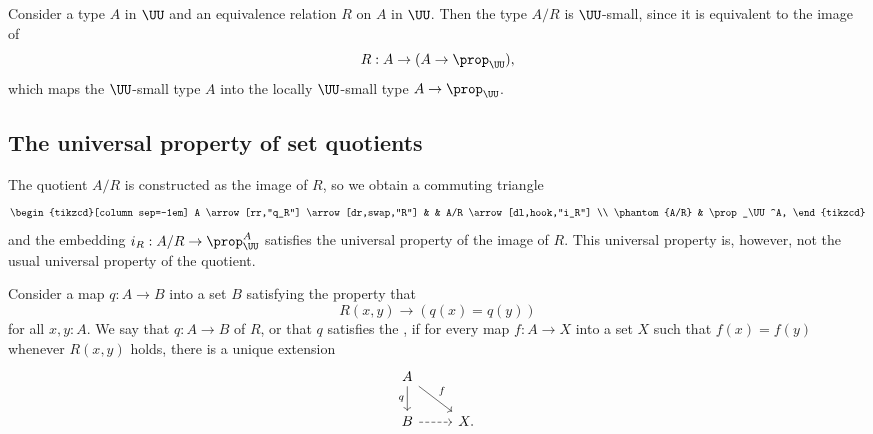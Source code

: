 \begin{eg}
  Consider a type $A$ in $\UU$ and an equivalence relation $R$ on $A$ in $\UU$. Then the type $A/R$ is $\UU$-small, since it is equivalent to the image of
  \begin{equation*}
    R:A\to (A\to\prop_\UU),
  \end{equation*}
  which maps the $\UU$-small type $A$ into the locally $\UU$-small type $A\to\prop_\UU$.
\end{eg}

\subsection{The universal property of set quotients}

The quotient $A/R$ is constructed as the image of $R$, so we obtain a commuting triangle
\begin{equation*}
  \begin{tikzcd}[column sep=-1em]
    A \arrow[rr,"q_R"] \arrow[dr,swap,"R"] & & A/R \arrow[dl,hook,"i_R"] \\
    \phantom{A/R} & \prop_\UU^A,
  \end{tikzcd}
\end{equation*}
and the embedding $i_R:A/R\to\prop_\UU^A$ satisfies the universal property of the image of $R$. This universal property is, however, not the usual universal property of the quotient.

\begin{defn}
  Consider a map $q:A\to B$ into a set $B$ satisfying the property that
  \begin{equation*}
    R(x,y)\to (q(x)=q(y))
  \end{equation*}
  for all $x,y:A$. We say that $q:A\to B$  of $R$, or that $q$ satisfies the , if for every map $f:A\to X$ into a set $X$ such that $f(x)=f(y)$ whenever $R(x,y)$ holds, there is a unique extension
  \begin{equation*}
    \begin{tikzcd}
      A \arrow[d,swap,"q"] \arrow[dr,"f"] \\
      B \arrow[r,dashed] & X.
    \end{tikzcd}
  \end{equation*}
\end{defn}


